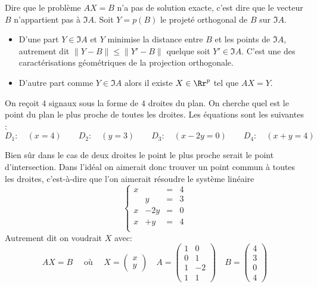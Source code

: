 \documentclass[class=report,crop=false]{standalone}
\begin{document}
Dire que le problème $AX=B$ n'a pas de solution exacte, c'est dire 
que le vecteur $B$ n'appartient pas à $\Im A$.
Soit $Y = p(B)$ le projeté orthogonal de $B$ sur $\Im A$. 
\begin{itemize}
  \item D'une part $Y \in \Im A$ et $Y$ minimise la distance entre $B$ et les points de $\Im A$,
autrement dit $\| Y-B\| \le \| Y'-B\|$ quelque soit $Y'\in\Im A$. C'est une des 
caractérisations géométriques de la projection orthogonale.
  
  \item D'autre part comme $Y \in \Im A$ alors il existe $X \in \Rr^p$ tel que 
  $AX = Y$.
\end{itemize}


\begin{exemple}
On reçoit $4$ signaux sous la forme de $4$ droites du plan.
On cherche quel est le point du plan \og le plus proche \fg{}  de toutes les droites.
Les équations sont les suivantes :
$$D_1 : \quad (x=4) \qquad D_2 :\quad (y=3) \qquad
D_3 : \quad (x-2y=0) \qquad D_4 : \quad (x+y=4)$$

Bien sûr dans le cas de deux droites le point \og le plus proche \fg{} 
serait le point d'intersection. Dans l'idéal on aimerait donc trouver un point commun 
à toutes les droites, c'est-à-dire que l'on aimerait résoudre le système linéaire
$$\left\lbrace\begin{array}{cccl}
x&&=&4\\
&y&=&3\\
x&-2y&=&0\\
x&+y&=&4\\
\end{array}\right.$$
Autrement dit on voudrait $X$ avec: 
$$AX = B \quad \text{ où } \quad 
X=\begin{pmatrix}x\\y\end{pmatrix}\quad
A=\begin{pmatrix}1&0\\0&1\\1&-2\\1&1\end{pmatrix}\quad
B=\begin{pmatrix}4\\3\\0\\4\end{pmatrix}$$


\end{exemple}
\end{document}

